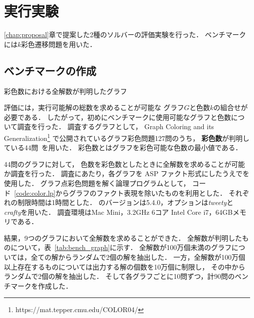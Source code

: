 \section{実行実験} \label{chap:experiment}
\ref{chap:proposal}章で提案した2種のソルバーの評価実験を行った．
ベンチマークには$k$彩色遷移問題を用いた．

\subsection{ベンチマークの作成}
\begin{table}[t]
  \centering
  \caption{彩色数における全解数が判明したグラフ}
  \label{tab:bench_graph}
  
\end{table}

評価には，実行可能解の総数を求めることが可能な
グラフ$G$と色数$k$の組合せが必要である．
したがって，初めにベンチマークに使用可能なグラフと色数について調査を行った．
調査するグラフとして，
Graph Coloring and its Generalization\footnote{https://mat.tepper.cmu.edu/COLOR04/}
で公開されているグラフ彩色問題127問のうち，
\textbf{彩色数}が判明している44問~\cite{DBLP:journals/constraints/TamuraTKB09}を用いた．
彩色数とはグラフを彩色可能な色数の最小値である．

44問のグラフに対して，
色数を彩色数としたときに全解数を求めることが可能か調査を行った．
調査にあたり，各グラフを ASP ファクト形式にしたうえで{\clingo}を使用した．
グラフ点彩色問題を解く論理プログラムとして，
コード~\ref{code:color.lp}からグラフのファクト表現を除いたものを利用とした．
それぞれの制限時間は1時間とした．
{\clingo}のバージョンは5.4.0，オプションは\textsl{tweety}と\textsl{crafty}を用いた．
調査環境はMac Mini，3.2GHz 6コア Intel Core i7，64GBメモリである．

結果，9つのグラフにおいて全解数を求めることができた．
全解数が判明したものについて，表~\ref{tab:bench_graph}に示す．
全解数が100万個未満のグラフについては，全ての解からランダムで2個の解を抽出した．
一方，全解数が100万個以上存在するものについては出力する解の個数を10万個に制限し，
その中からランダムで2個の解を抽出した．
そして各グラフごとに10問ずつ，計90問のベンチマークを作成した．

